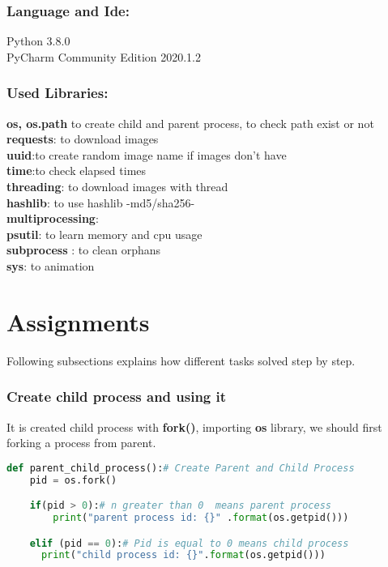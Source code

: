 \documentclass[onecolumn]{article}
\begin{document}
\subsubsection{Language and Ide:}
Python  3.8.0 \\
PyCharm Community Edition 2020.1.2

\subsubsection{Used Libraries: }
\textbf{os, os.path}
to create child and parent process,
to check path exist or not  \\ 
\textbf{requests}: to download images\\ 
\textbf{uuid}:to create random image name if images don't have  \\ 
\textbf{time}:to check elapsed times \\ 
\textbf{threading}: to download images with thread\\ 
\textbf{hashlib}: to use hashlib -md5/sha256-  \\ 
\textbf{multiprocessing}:  \\ 
\textbf{ psutil}: to learn memory and cpu usage \\  
\textbf{ subprocess} : to clean orphans \\ 
\textbf{sys}: to animation

\section{Assignments}
Following subsections explains how different tasks solved step by step.

\subsubsection{Create child process and using it}
It is created child process with \textbf{fork()},  importing \textbf{os} library, we should first forking a process from parent. \\

\begin{lstlisting}[language=Python, caption=Creating child process then writing its process id]
def parent_child_process():# Create Parent and Child Process
    pid = os.fork()                 

    if(pid > 0):# n greater than 0  means parent process 
	    print("parent process id: {}" .format(os.getpid()))

    elif (pid == 0):# Pid is equal to 0 means child process
      print("child process id: {}".format(os.getpid())) 
\end{lstlisting} \\ \\
\end{document}
